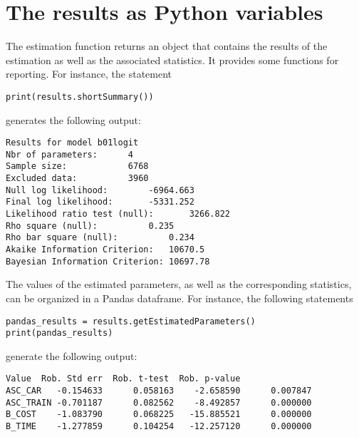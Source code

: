 \documentclass[12pt,a4paper]{article}
\begin{document}
\section{The results as Python variables}

The estimation function returns an object that contains the results of
the estimation as well as the associated statistics. It provides some functions for reporting.
For instance, the statement
\begin{lstlisting}[style=nonumbers]
print(results.shortSummary())
\end{lstlisting}
generates the following output:

\begin{lstlisting}[style=nonumbers]
Results for model b01logit
Nbr of parameters:		4
Sample size:			6768
Excluded data:			3960
Null log likelihood:		-6964.663
Final log likelihood:		-5331.252
Likelihood ratio test (null):		3266.822
Rho square (null):			0.235
Rho bar square (null):			0.234
Akaike Information Criterion:	10670.5
Bayesian Information Criterion:	10697.78
\end{lstlisting}

The values of the estimated parameters, as well as the corresponding statistics, can be organized in a Pandas dataframe. For instance, the following statements
\begin{lstlisting}[style=nonumbers]
pandas_results = results.getEstimatedParameters()
print(pandas_results)
\end{lstlisting}
generate the following output:
\begin{lstlisting}[style=nonumbers]
              Value  Rob. Std err  Rob. t-test  Rob. p-value
ASC_CAR   -0.154633      0.058163    -2.658590      0.007847
ASC_TRAIN -0.701187      0.082562    -8.492857      0.000000
B_COST    -1.083790      0.068225   -15.885521      0.000000
B_TIME    -1.277859      0.104254   -12.257120      0.000000
\end{lstlisting}
\end{document}
